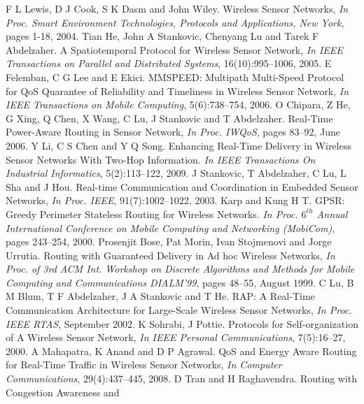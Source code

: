 \documentclass[fleqn,twoside]{article}
\begin{document}
\begin{thebibliography}{36}





F L Lewis, D J Cook, S K Dasm and John Wiley. {Wireless Sensor
  Networks}, \emph{In Proc. Smart Environment Technologies, Protocols and
  Applications, New York}, pages 1-18, 2004.
Tian He, John A Stankovic, Chenyang Lu and Tarek F Abdelzaher. {A
  Spatiotemporal Protocol for Wireless Sensor Network}, \emph{In IEEE
  Transactions on Parallel and Distributed Systems}, 16(10):995--1006, 2005.
E Felemban, C G Lee and E Ekici. {MMSPEED: Multipath Multi-Speed
  Protocol for QoS Quarantee of Reliability and Timeliness in Wireless Sensor
  Network}, \emph{In IEEE Transactions on Mobile Computing}, 5(6):738--754, 2006.
O Chipara, Z He, G Xing, Q Chen, X Wang, C Lu, J Stankovic and T
  Abdelzaher. {Real-Time Power-Aware Routing in Sensor Network}, 
  \emph{In Proc. IWQoS}, pages 83--92, June 2006.
Y Li, C S Chen and Y Q Song. {Enhancing Real-Time Delivery in Wireless
  Sensor Networks With Two-Hop Information}. \emph{In IEEE Transactions On
  Industrial Informatics}, 5(2):113--122, 2009.
J Stankovic, T Abdelzaher, C Lu, L Sha and J Hou. {Real-time
  Communication and Coordination in Embedded Sensor Networks}, \emph{In Proc.
  IEEE}, 91(7):1002--1022, 2003.
Karp and Kung H T. {GPSR: Greedy Perimeter Stateless Routing for
  Wireless Networks}. \emph{In Proc. $6^{th}$ Annual International Conference on
  Mobile Computing and Networking (MobiCom)}, pages 243--254, 2000.
Prosenjit Bose, Pat Morin, Ivan Stojmenovi and Jorge Urrutia. {Routing
  with Guaranteed Delivery in Ad hoc Wireless Networks}, \emph{In Proc. of
  3rd ACM Int. Workshop on Discrete Algorithms and Methods for Mobile Computing
  and Communications DIALM'99}, pages 48--55, August 1999.
C Lu, B M Blum, T F Abdelzaher, J A Stankovic and T He. {RAP: A
  Real-Time Communication Architecture for Large-Scale Wireless Sensor
  Networks}, \emph{In Proc. IEEE RTAS}, September 2002.
K Sohrabi, J Pottie. {Protocols for Self-organization of A Wireless
  Sensor Network}, \emph{In IEEE Personal Communications}, 7(5):16--27, 2000.
A Mahapatra, K Anand and D P Agrawal. {QoS and Energy Aware Routing for
  Real-Time Traffic in Wireless Sensor Networks}, \emph{In Computer
  Communications}, 29(4):437--445, 2008.
D Tran and H Raghavendra. {Routing with Congestion Awareness and
}
\end{thebibliography}
\end{document}
